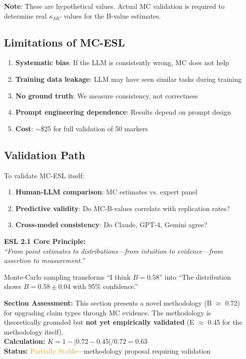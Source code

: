 \documentclass[11pt,a4paper]{article}
\begin{document}
\textbf{Note}: These are hypothetical values. Actual MC validation is required to determine real $\kappa_{MC}$ values for the B-value estimates.

\subsection{Limitations of MC-ESL}

\begin{enumerate}
    \item \textbf{Systematic bias}: If the LLM is consistently wrong, MC does not help
    \item \textbf{Training data leakage}: LLM may have seen similar tasks during training
    \item \textbf{No ground truth}: We measure consistency, not correctness
    \item \textbf{Prompt engineering dependence}: Results depend on prompt design
    \item \textbf{Cost}: $\sim$\$25 for full validation of 50 markers
\end{enumerate}

\subsection{Validation Path}

To validate MC-ESL itself:
\begin{enumerate}
    \item \textbf{Human-LLM comparison}: MC estimates vs. expert panel
    \item \textbf{Predictive validity}: Do MC-B-values correlate with replication rates?
    \item \textbf{Cross-model consistency}: Do Claude, GPT-4, Gemini agree?
\end{enumerate}

\begin{insightbox}
\textbf{ESL 2.1 Core Principle:} \\[0.3em]
\textit{``From point estimates to distributions---from intuition to evidence---from assertion to measurement.''}

Monte-Carlo sampling transforms ``I think $B = 0.58$'' into ``The distribution shows $B = 0.58 \pm 0.04$ with 95\% confidence.''
\end{insightbox}

\begin{eslbox}
\textbf{Section Assessment:} This section presents a novel methodology (B $\approx$ 0.72) for upgrading claim types through MC evidence. The methodology is theoretically grounded but \textbf{not yet empirically validated} (E $\approx$ 0.45 for the methodology itself). \\[0.3em]
\textbf{Calculation:} $K = 1 - |0.72 - 0.45| / 0.72 = 0.63$ \\
\textbf{Status:} \textcolor{orange}{Partially Stable}---methodology proposal requiring validation
\end{eslbox}
\end{document}
